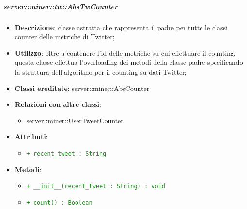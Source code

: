 	\subparagraph{server::miner::tw::AbsTwCounter} %
		\label{subp:server_miner_tw_AbsTwCounter}
			\begin{itemize}
				\item \textbf{Descrizione}: classe astratta che rappresenta il padre per tutte le classi counter delle metriche di Twitter;
				\item \textbf{Utilizzo}: oltre a contenere l’id delle metriche su cui effettuare il counting, questa classe effettua l'overloading dei metodi della classe padre specificando la struttura dell'algoritmo per il counting su dati Twitter;
				\item \textbf{Classi ereditate}: server::miner::AbsCounter
				\item \textbf{Relazioni con altre classi}:
					\begin{itemize}
						\item server::miner::UserTweetCounter
					\end{itemize}
				\item \textbf{Attributi}:
					\begin{itemize}
						\item \textcolor{forestgreen}{\texttt{+ recent\_tweet : String}}
					\end{itemize}
				\item \textbf{Metodi}: 
					\begin{itemize}
						\item \textcolor{forestgreen}{\texttt{+ \_\_init\_\_(recent\_tweet : String) : void}}
						\item \textcolor{forestgreen}{\texttt{+ count() : Boolean}}
\end{itemize}
\end{itemize}
